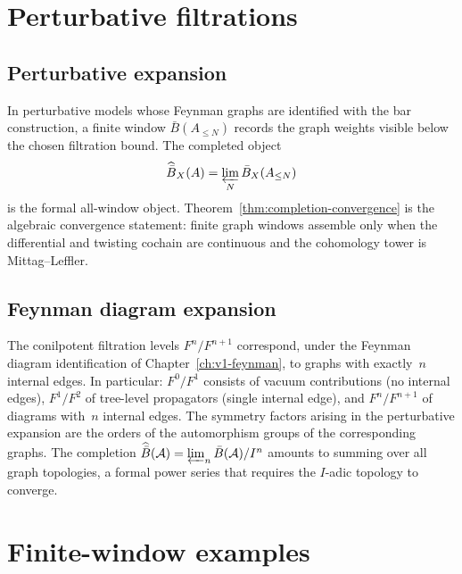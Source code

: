 \section{Perturbative filtrations}

\subsection{Perturbative expansion}

\begin{interpretation}\label{interp:completion-renorm}
In perturbative models whose Feynman graphs are identified with the
bar construction, a finite window $\bar B(A_{\le N})$ records the graph
weights visible below the chosen filtration bound.  The completed
object
\[
\widehat{\bar B}_X(A)=\varprojlim_N\bar B_X(A_{\le N})
\]
is the formal all-window object.  Theorem~\ref{thm:completion-convergence}
is the algebraic convergence statement: finite graph windows assemble
only when the differential and twisting cochain are continuous and the
cohomology tower is Mittag--Leffler.
\end{interpretation}

\subsection{Feynman diagram expansion}

\begin{remark}\label{rem:feynman-conilpotent}
The conilpotent filtration levels $F^n/F^{n+1}$ correspond, under the Feynman diagram identification of Chapter~\ref{ch:v1-feynman}, to graphs with exactly~$n$ internal edges. In particular: $F^0/F^1$ consists of vacuum contributions (no internal edges), $F^1/F^2$ of tree-level propagators (single internal edge), and $F^n/F^{n+1}$ of diagrams with~$n$ internal edges. The symmetry factors arising in the perturbative expansion are the orders of the automorphism groups of the corresponding graphs. The completion $\widehat{\bar{B}}(\mathcal{A}) = \varprojlim_n \bar{B}(\mathcal{A})/I^n$ amounts to summing over all graph topologies, a formal power series that requires the $I$-adic topology to converge.
\end{remark}

\section{Finite-window examples}

